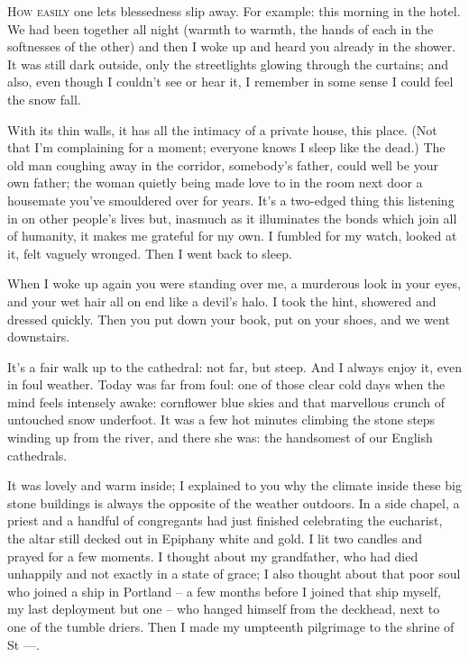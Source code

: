 \textsc{How easily} one lets blessedness slip away. For example: this morning in the hotel. We had been together all night (warmth to warmth, the hands of each in the softnesses of the other) and then I woke up and heard you already in the shower. It was still dark outside, only the streetlights glowing through the curtains; and also, even though I couldn't see or hear it, I remember in some sense I could feel the snow fall.

With its thin walls, it has all the intimacy of a private house, this place. (Not that I'm complaining for a moment; everyone knows I sleep like the dead.) The old man coughing away in the corridor, somebody's father, could well be your own father; the woman quietly being made love to in the room next door a housemate you've smouldered over for years. It's a two-edged thing this listening in on other people's lives but, inasmuch as it illuminates the bonds which join all of humanity, it makes me grateful for my own. I fumbled for my watch, looked at it, felt vaguely wronged. Then I went back to sleep.

When I woke up again you were standing over me, a murderous look in your eyes, and your wet hair all on end like a devil's halo. I took the hint, showered and dressed quickly. Then you put down your book, put on your shoes, and we went downstairs.

It's a fair walk up to the cathedral: not far, but steep. And I always enjoy it, even in foul weather. Today was far from foul: one of those clear cold days when the mind feels intensely awake: cornflower blue skies and that marvellous crunch of untouched snow underfoot. It was a few hot minutes climbing the stone steps winding up from the river, and there she was: the handsomest of our English cathedrals.

It was lovely and warm inside; I explained to you why the climate inside these big stone buildings is always the opposite of the weather outdoors. In a side chapel, a priest and a handful of congregants had just finished celebrating the eucharist, the altar still decked out in Epiphany white and gold. I lit two candles and prayed for a few moments. I thought about my grandfather, who had died unhappily and not exactly in a state of grace; I also thought about that poor soul who joined a ship in Portland -- a few months before I joined that ship myself, my last deployment but one -- who hanged himself from the deckhead, next to one of the tumble driers. Then I made my umpteenth pilgrimage to the shrine of St ---.

